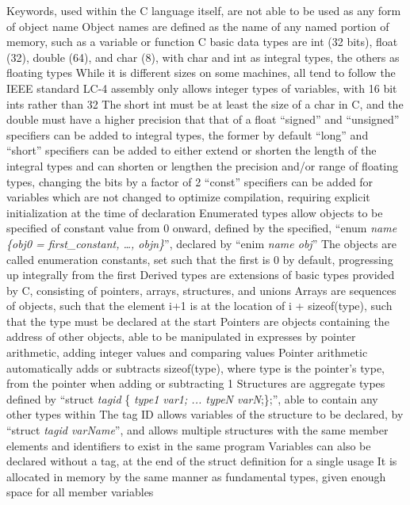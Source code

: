\documentclass[11 pt, twoside]{article}
\newenvironment{outline*}
{
	\begin{outline}[enumerate]
	}
	{\end{outline}
}
\begin{document}
\begin{outline*}
\2 Keywords, used within the C language itself, are not able to be used as any form of object name
\3 Object names are defined as the name of any named portion of memory, such as a variable or function
\1 C basic data types are int (32 bits), float (32), double (64), and char (8), with char and int as integral types, the others as floating types
\2 While it is different sizes on some machines, all tend to follow the IEEE standard
\2 LC-4 assembly only allows integer types of variables, with 16 bit ints rather than 32
\2 The short int must be at least the size of a char in C, and the double must have a higher precision that that of a float
\2 ``signed'' and ``unsigned'' specifiers can be added to integral types, the former by default
\2 ``long'' and ``short'' specifiers can be added to either extend or shorten the length of the integral types and can shorten or lengthen the precision and/or range of floating types, changing the bits by a factor of 2
\2 ``const'' specifiers can be added for variables which are not changed to optimize compilation, requiring explicit initialization at the time of declaration
\1 Enumerated types allow objects to be specified of constant value from 0 onward, defined by the specified, ``enum \textit{name \{obj0 = first\_constant, \dots, objn\}}'', declared by ``enim \textit{name obj}''
\2 The objects are called enumeration constants, set such that the first is 0 by default, progressing up integrally from the first
\1 Derived types are extensions of basic types provided by C, consisting of pointers, arrays, structures, and unions
\2 Arrays are sequences of objects, such that the element i+1 is at the location of i + sizeof(type), such that the type must be declared at the start
\2 Pointers are objects containing the address of other objects, able to be manipulated in expresses by pointer arithmetic, adding integer values and comparing values
\3 Pointer arithmetic automatically adds or subtracts sizeof(type), where type is the pointer's type, from the pointer when adding or subtracting 1
\2 Structures are aggregate types defined by ``struct \textit{tagid} \{ \textit{type1 var1; ... typeN varN};\};'', able to contain any other types within
\3 The tag ID allows variables of the structure to be declared, by ``struct \textit{tagid varName}'', and allows multiple structures with the same member elements and identifiers to exist in the same program
\3 Variables can also be declared without a tag, at the end of the struct definition for a single usage
\3 It is allocated in memory by the same manner as fundamental types, given enough space for all member variables

\end{outline*}
\end{document}
